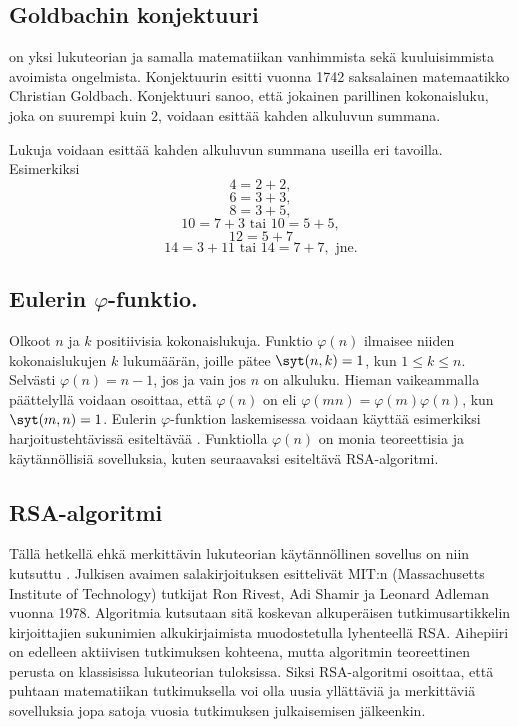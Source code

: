 \subsection*{Goldbachin konjektuuri}
 on yksi lukuteorian ja samalla matematiikan vanhimmista sekä kuuluisimmista avoimista ongelmista. Konjektuurin esitti vuonna 1742 saksalainen mate\-maa\-tik\-ko Christian Goldbach. Konjektuuri sanoo, että jokainen parillinen kokonaisluku, joka on suurempi kuin $2$, voidaan esittää kahden alkuluvun summana. 

Lukuja voidaan esittää kahden alkuluvun summana useilla eri tavoilla. Esimerkiksi
\[
  4 = 2 + 2,
\]
\[
  6 = 3 + 3,
\]
\[
  8 = 3 + 5,
\]
\[
10 = 7 + 3\textrm{ tai } 10=5 + 5,
\]
\[
12 = 5 + 7
\]
\[
14 = 3 + 11\textrm{ tai }14 =7 + 7, \textrm{ jne.}
\]

\subsection*{Eulerin $\varphi$-funktio.} 
Olkoot $n$ ja $k$ positiivisia kokonaislukuja. Funktio $\varphi(n)$ ilmaisee niiden kokonaislukujen $k$ lukumäärän, joille pätee  $\syt(n, k) = 1$, kun $1\le k \le n$. Selvästi $\varphi(n)=n-1$, jos ja vain jos $n$ on alkuluku. Hieman vaikeammalla päättelyllä voidaan osoittaa, että $\varphi(n)$ on  eli $\varphi(mn)=\varphi(m)\varphi(n)$, kun $\syt(m, n)=1$.
Eulerin $\varphi$-funktion laskemisessa voidaan käyttää esimerkiksi harjoitustehtävissä esiteltävää . Funktiolla $\varphi(n)$ on monia teoreettisia ja käy\-tän\-nöl\-li\-siä sovelluksia, kuten seuraavaksi esiteltävä RSA-algoritmi.

\subsection*{RSA-algoritmi} Tällä hetkellä ehkä merkittävin lukuteorian käy\-tän\-nöl\-li\-nen sovellus on niin kutsuttu . Julkisen avaimen salakirjoituksen esittelivät MIT:n (Massachusetts Institute of Technology) tutkijat Ron Rivest, Adi Shamir ja Leonard Adleman vuonna 1978. %
Algoritmia kutsutaan sitä koskevan alkuperäisen tutkimusartikkelin kirjoittajien sukunimien alkukirjaimista muodostetulla lyhenteellä RSA. Aihepiiri on edelleen aktiivisen tutkimuksen kohteena, mutta algoritmin teoreettinen perusta on klassisissa lukuteorian tuloksissa. Siksi RSA-algoritmi osoittaa, että puhtaan matematiikan tutkimuksella voi olla uusia yllättäviä ja merkittäviä sovelluksia jopa satoja vuosia tutkimuksen julkaisemisen jälkeenkin.

